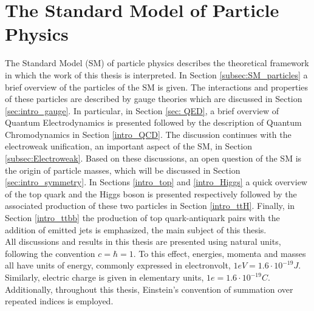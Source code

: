 \cleardoublepage%
\chapter{\label{chap:first}The Standard Model of Particle Physics}%
\noindent The Standard Model (SM) of particle physics describes the theoretical framework in which the work of this thesis is interpreted. In Section \ref{subsec:SM_particles} a brief overview of the particles of the SM is given. The interactions and properties of these particles are described by gauge theories which are discussed in Section \ref{sec:intro_gauge}. In particular, in Section \ref{sec: QED}, a brief overview of Quantum Electrodynamics is presented followed by the description of Quantum Chromodynamics in Section \ref{intro_QCD}. The discussion continues with the electroweak unification, an important aspect of the SM, in Section \ref{subsec:Electroweak}.  Based on these discussions, an open question of the SM is the origin of particle masses, which will be discussed in Section \ref{sec:intro_symmetry}. In Sections \ref{intro_top} and \ref{intro_Higgs} a quick overview of the top quark and the Higgs boson is presented respectively followed by the associated production of these two particles in Section \ref{intro_ttH}. Finally, in Section \ref{intro_ttbb} the production of top quark-antiquark pairs with the addition of emitted jets is emphasized, the main subject of this thesis.\\
\indent All discussions and results in this thesis are presented using natural units, following the convention $c = \hbar = 1$. To this effect, energies, momenta and masses all have units of energy, commonly expressed in electronvolt, $1 eV = 1.6\cdot 10^{-19} J$. Similarly, electric charge is given in elementary units, $1e = 1.6\cdot 10^{-19} C$. Additionally, throughout this thesis, Einstein's convention of summation over repeated indices is employed.


